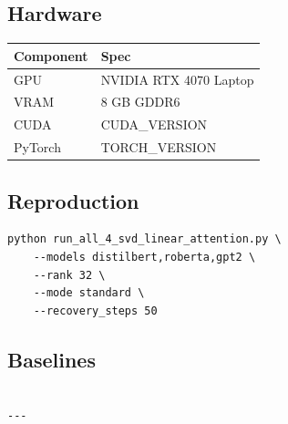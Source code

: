 \subsection{Hardware}

\begin{table}[H]
\centering
\small
\begin{tabular}{ll}
\toprule
\textbf{Component} & \textbf{Spec} \\
\midrule
GPU & NVIDIA RTX 4070 Laptop \\
VRAM & 8 GB GDDR6 \\
CUDA & {{CUDA\_VERSION}} \\
PyTorch & {{TORCH\_VERSION}} \\
\bottomrule
\end{tabular}
\end{table}

\subsection{Reproduction}

\begin{lstlisting}
python run_all_4_svd_linear_attention.py \
    --models distilbert,roberta,gpt2 \
    --rank 32 \
    --mode standard \
    --recovery_steps 50
\end{lstlisting}

\subsection{Baselines}

\begin{lstlisting}

---
\end{lstlisting}